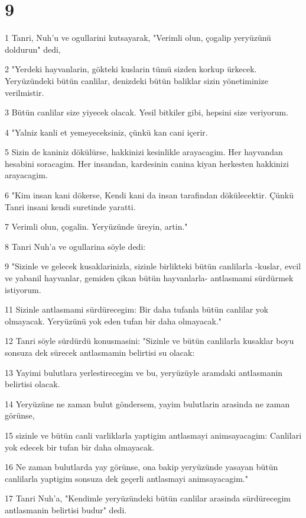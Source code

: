 \chapter{9}

\par 1 Tanri, Nuh'u ve ogullarini kutsayarak, "Verimli olun, çogalip yeryüzünü doldurun" dedi,
\par 2 "Yerdeki hayvanlarin, gökteki kuslarin tümü sizden korkup ürkecek. Yeryüzündeki bütün canlilar, denizdeki bütün baliklar sizin yönetiminize verilmistir.
\par 3 Bütün canlilar size yiyecek olacak. Yesil bitkiler gibi, hepsini size veriyorum.
\par 4 "Yalniz kanli et yemeyeceksiniz, çünkü kan cani içerir.
\par 5 Sizin de kaniniz dökülürse, hakkinizi kesinlikle arayacagim. Her hayvandan hesabini soracagim. Her insandan, kardesinin canina kiyan herkesten hakkinizi arayacagim.
\par 6 "Kim insan kani dökerse, Kendi kani da insan tarafindan dökülecektir. Çünkü Tanri insani kendi suretinde yaratti.
\par 7 Verimli olun, çogalin. Yeryüzünde üreyin, artin."
\par 8 Tanri Nuh'a ve ogullarina söyle dedi:
\par 9 "Sizinle ve gelecek kusaklarinizla, sizinle birlikteki bütün canlilarla -kuslar, evcil ve yabanil hayvanlar, gemiden çikan bütün hayvanlarla- antlasmami sürdürmek istiyorum.
\par 11 Sizinle antlasmami sürdürecegim: Bir daha tufanla bütün canlilar yok olmayacak. Yeryüzünü yok eden tufan bir daha olmayacak."
\par 12 Tanri söyle sürdürdü konusmasini: "Sizinle ve bütün canlilarla kusaklar boyu sonsuza dek sürecek antlasmamin belirtisi su olacak:
\par 13 Yayimi bulutlara yerlestirecegim ve bu, yeryüzüyle aramdaki antlasmanin belirtisi olacak.
\par 14 Yeryüzüne ne zaman bulut göndersem, yayim bulutlarin arasinda ne zaman görünse,
\par 15 sizinle ve bütün canli varliklarla yaptigim antlasmayi animsayacagim: Canlilari yok edecek bir tufan bir daha olmayacak.
\par 16 Ne zaman bulutlarda yay görünse, ona bakip yeryüzünde yasayan bütün canlilarla yaptigim sonsuza dek geçerli antlasmayi animsayacagim."
\par 17 Tanri Nuh'a, "Kendimle yeryüzündeki bütün canlilar arasinda sürdürecegim antlasmanin belirtisi budur" dedi.
